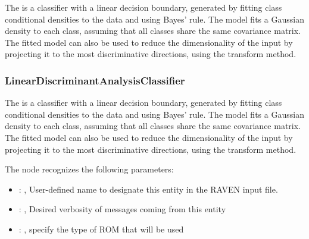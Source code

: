  The  is a classifier with a linear decision boundary,
 generated by fitting class conditional densities to the data and using Bayes' rule.     The model
 fits a Gaussian density to each class, assuming that all classes share the same covariance matrix.
 The fitted model can also be used to reduce the dimensionality of the input by projecting it to the
 most discriminative     directions, using the transform method.

\subsubsection{LinearDiscriminantAnalysisClassifier}
  The  is a classifier with a linear decision
  boundary,     generated by fitting class conditional densities to the data and using Bayes' rule.
  The model fits a Gaussian density to each class, assuming that all classes share the same
  covariance matrix.     The fitted model can also be used to reduce the dimensionality of the input
  by projecting it to the most discriminative     directions, using the transform method.

  The  node recognizes the following parameters:
    \begin{itemize}
      \item {}: , 
        User-defined name to designate this entity in the RAVEN input file.
      \item {}: , 
        Desired verbosity of messages coming from this entity
      \item {}: , 
        specify the type of ROM that will be used
  \end{itemize}

